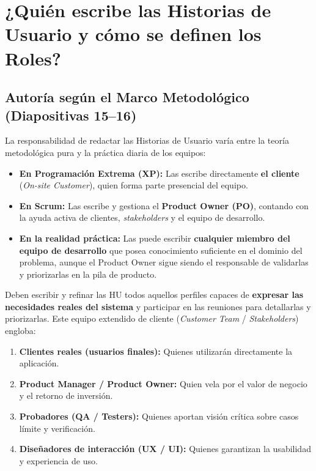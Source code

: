 \section{¿Quién escribe las Historias de Usuario y cómo se definen los Roles?}

\subsection{Autoría según el Marco Metodológico (Diapositivas 15--16)}

La responsabilidad de redactar las Historias de Usuario varía entre la teoría metodológica pura y la práctica diaria de los equipos:
\begin{itemize}[itemsep=4pt]
    \item \textbf{En Programación Extrema (XP):} Las escribe directamente \textbf{el cliente} (\textit{On-site Customer}), quien forma parte presencial del equipo.
    \item \textbf{En Scrum:} Las escribe y gestiona el \textbf{Product Owner (PO)}, contando con la ayuda activa de clientes, \textit{stakeholders} y el equipo de desarrollo.
    \item \textbf{En la realidad práctica:} Las puede escribir \textbf{cualquier miembro del equipo de desarrollo} que posea conocimiento suficiente en el dominio del problema, aunque el Product Owner sigue siendo el responsable de validarlas y priorizarlas en la pila de producto.
\end{itemize}

\begin{definicion}
Deben escribir y refinar las HU todos aquellos perfiles capaces de \textbf{expresar las necesidades reales del sistema} y participar en las reuniones para detallarlas y priorizarlas. Este equipo extendido de cliente (\textit{Customer Team} / \textit{Stakeholders}) engloba:
\begin{enumerate}[label=\textbf{\arabic*.}, itemsep=2pt]
    \item \textbf{Clientes reales (usuarios finales):} Quienes utilizarán directamente la aplicación.
    \item \textbf{Product Manager / Product Owner:} Quien vela por el valor de negocio y el retorno de inversión.
    \item \textbf{Probadores (QA / Testers):} Quienes aportan visión crítica sobre casos límite y verificación.
    \item \textbf{Diseñadores de interacción (UX / UI):} Quienes garantizan la usabilidad y experiencia de uso.
\end{enumerate}
\end{definicion}

